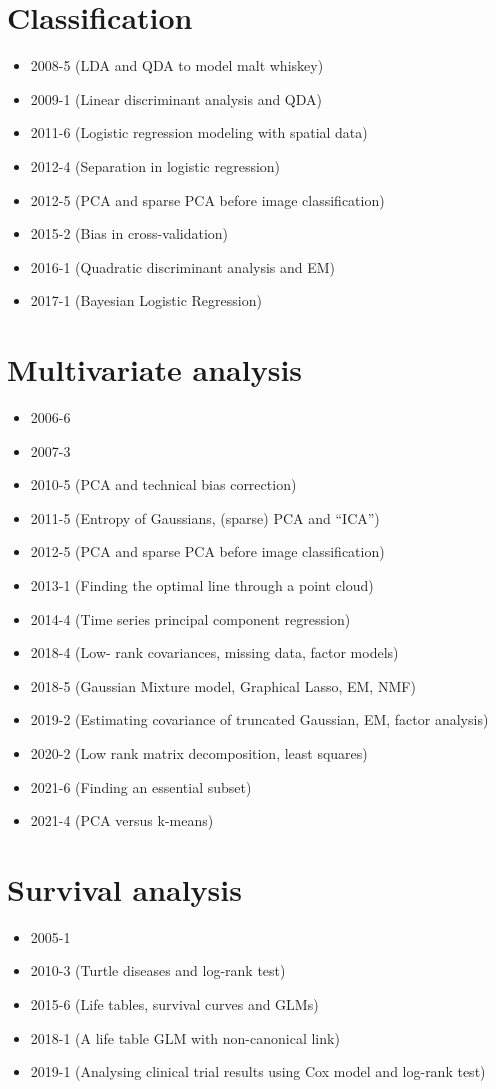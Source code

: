 \documentclass[12pt]{article}
\begin{document}
\section*{Classification}
\begin{itemize}
\item 2008-5 (LDA and QDA to model malt whiskey)
\item 2009-1 (Linear discriminant analysis and QDA)
\item 2011-6 (Logistic regression modeling with spatial data)
\item 2012-4 (Separation in logistic regression)
\item 2012-5 (PCA and sparse PCA before image classification)
\item 2015-2 (Bias in cross-validation)
\item 2016-1 (Quadratic discriminant analysis and EM)
\item 2017-1 (Bayesian Logistic Regression)
\end{itemize}

\section*{Multivariate analysis}
\begin{itemize}
\item 2006-6
\item 2007-3
\item 2010-5 (PCA and technical bias correction)
\item 2011-5 (Entropy of Gaussians, (sparse) PCA and ``ICA'')
\item 2012-5 (PCA and sparse PCA before image classification)
\item 2013-1 (Finding the optimal line through a point cloud)
\item 2014-4 (Time series principal component regression)
\item 2018-4 (Low- rank covariances, missing data, factor models)
\item 2018-5 (Gaussian Mixture model, Graphical Lasso, EM, NMF)
\item 2019-2 (Estimating covariance of truncated Gaussian, EM, factor analysis)
\item 2020-2 (Low rank matrix decomposition, least squares)
\item 2021-6 (Finding an essential subset)
\item 2021-4 (PCA versus k-means)
\end{itemize}

\section*{Survival analysis}
\begin{itemize}
\item 2005-1
\item 2010-3 (Turtle diseases and log-rank test)
\item 2015-6 (Life tables, survival curves and GLMs)
\item 2018-1 (A life table GLM with non-canonical link)
\item 2019-1 (Analysing clinical trial results using Cox model and log-rank test)
\end{itemize}
\end{document}
